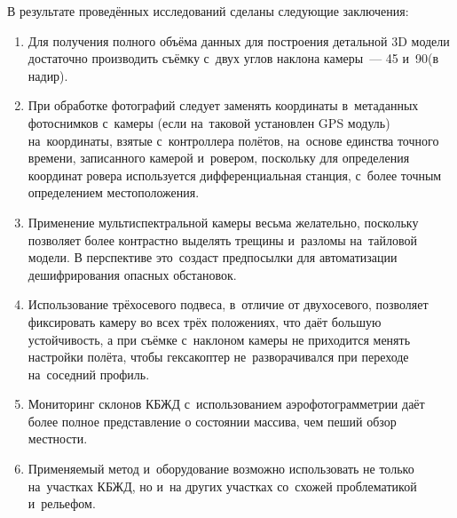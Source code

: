 В результате проведённых исследований сделаны следующие заключения:
\begin{enumerate}[noitemsep]\vspace{-8pt}
\item Для получения полного объёма данных для построения детальной 3D модели достаточно производить съёмку с~двух углов наклона камеры~--- 45 и~90\dg (в надир).
\item При обработке фотографий следует заменять координаты в~метаданных фотоснимков с~камеры (если на~таковой установлен GPS модуль) на~координаты, взятые с~контроллера полётов, на~основе единства точного времени, записанного камерой и~ровером, поскольку для определения координат ровера используется дифференциальная станция, с~более точным определением местоположения.
\item Применение мультиспектральной камеры весьма желательно, поскольку позволяет более контрастно выделять трещины и~разломы на~тайловой модели. В перспективе это~создаст предпосылки для автоматизации дешифрирования опасных обстановок.
\item Использование трёхосевого подвеса, в~отличие от двухосевого, позволяет фиксировать камеру во всех трёх положениях, что даёт большую устойчивость, а при съёмке с~наклоном камеры не приходится менять настройки полёта, чтобы гексакоптер не~разворачивался при переходе на~соседний профиль.
\item Мониторинг склонов КБЖД с~использованием аэрофотограмметрии даёт более полное представление о состоянии массива, чем пеший обзор местности.
\item Применяемый метод и~оборудование возможно использовать не только на~участках КБЖД, но и~на других участках со~схожей проблематикой и~рельефом.
\end{enumerate}
\vspace{-8pt}

